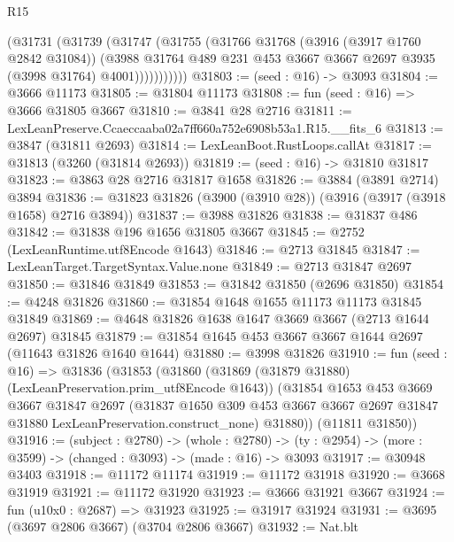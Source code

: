 \begin{lexlean}{R15}
\begin{coremodule}
              (@31731
                (@31739
                  (@31747
                    (@31755
                      (@31766
                        @31768
                        (@3916 (@3917 @1760 @2842 @31084))
                        (@3988
                          @31764
                          @489
                          @231
                          @453
                          @3667
                          @3667
                          @2697
                          @3935
                          (@3998 @31764)
                          @4001)))))))))))
@31803 := (seed : @16) -> @3093
@31804 := @3666 @11173
@31805 := @31804 @11173
@31808 := fun (seed : @16) => @3666 @31805 @3667
@31810 := @3841 @28 @2716
@31811 := LexLeanPreserve.Ccaeccaaba02a7ff660a752e6908b53a1.R15.__fits_6
@31813 := @3847 (@31811 @2693)
@31814 := LexLeanBoot.RustLoops.callAt
@31817 := @31813 (@3260 (@31814 @2693))
@31819 := (seed : @16) -> @31810 @31817
@31823 := @3863 @28 @2716 @31817 @1658
@31826 := @3884 (@3891 @2714) @3894
@31836 := @31823 @31826 (@3900 (@3910 @28)) (@3916 (@3917 (@3918 @1658) @2716 @3894))
@31837 := @3988 @31826
@31838 := @31837 @486
@31842 := @31838 @196 @1656 @31805 @3667
@31845 := @2752 (LexLeanRuntime.utf8Encode @1643)
@31846 := @2713 @31845
@31847 := LexLeanTarget.TargetSyntax.Value.none
@31849 := @2713 @31847 @2697
@31850 := @31846 @31849
@31853 := @31842 @31850 (@2696 @31850)
@31854 := @4248 @31826
@31860 := @31854 @1648 @1655 @11173 @11173 @31845 @31849
@31869 := @4648 @31826 @1638 @1647 @3669 @3667 (@2713 @1644 @2697) @31845
@31879 := @31854 @1645 @453 @3667 @3667 @1644 @2697 (@11643 @31826 @1640 @1644)
@31880 := @3998 @31826
@31910 := fun (seed : @16) =>
  @31836
    (@31853
      (@31860
        (@31869 (@31879 @31880) (LexLeanPreservation.prim_utf8Encode @1643))
        (@31854
          @1653
          @453
          @3669
          @3667
          @31847
          @2697
          (@31837
            @1650
            @309
            @453
            @3667
            @3667
            @2697
            @31847
            @31880
            LexLeanPreservation.construct_none)
          @31880))
      (@11811 @31850))
@31916 := (subject : @2780) ->
  (whole : @2780) -> (ty : @2954) -> (more : @3599) -> (changed : @3093) -> (made : @16) -> @3093
@31917 := @30948 @3403
@31918 := @11172 @11174
@31919 := @11172 @31918
@31920 := @3668 @31919
@31921 := @11172 @31920
@31923 := @3666 @31921 @3667
@31924 := fun (u10x0 : @2687) => @31923
@31925 := @31917 @31924
@31931 := @3695 (@3697 @2806 @3667) (@3704 @2806 @3667)
@31932 := Nat.blt

\end{coremodule}
\end{lexlean}
